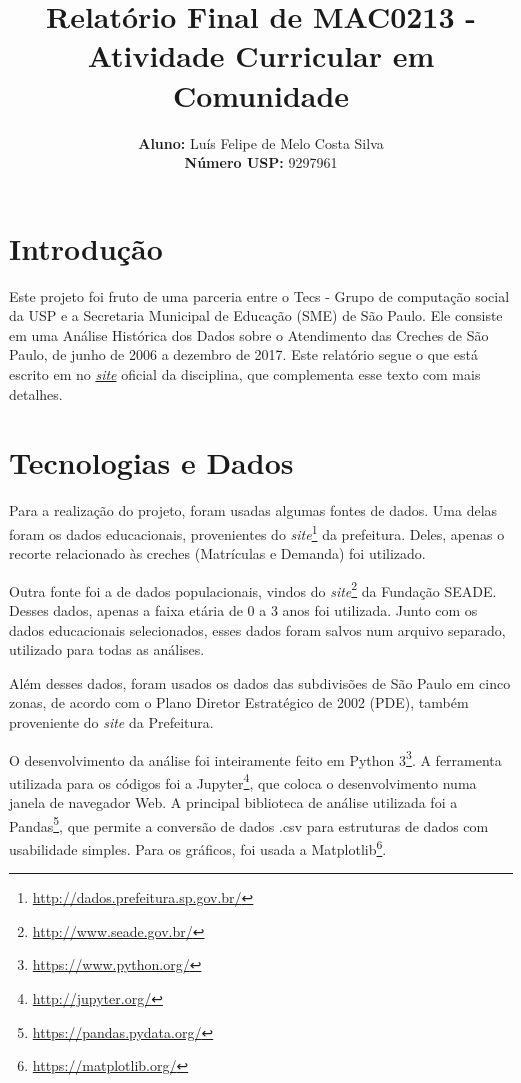 \documentclass[12pt, a4paper]{article}
\title{\textbf{Relatório Final de MAC0213 - Atividade Curricular em Comunidade}}
\author{
    \textbf{Aluno:} Luís Felipe de Melo Costa Silva \\
    \textbf{Número USP:} 9297961
    }
\date{}
\begin{document}
\maketitle

\section*{Introdução}

Este projeto foi fruto de uma parceria entre o Tecs - Grupo de computação social da USP e a Secretaria Municipal de Educação (SME) de São Paulo. Ele consiste em uma Análise Histórica dos Dados sobre o Atendimento das Creches de São Paulo, de junho de 2006 a dezembro de 2017. Este relatório segue o que está escrito em no \href{https://lsflp.github.io/MAC0213/}{\textit{site}} oficial da disciplina, que complementa esse texto com mais detalhes.

\section{Tecnologias e Dados}

Para a realização do projeto, foram usadas algumas fontes de dados. Uma delas foram os dados educacionais, provenientes do \textit{site}\footnote{\url{http://dados.prefeitura.sp.gov.br/}} da prefeitura. Deles, apenas o recorte relacionado às creches (Matrículas e Demanda) foi utilizado.

Outra fonte foi a de dados populacionais, vindos do \textit{site}\footnote{\url{http://www.seade.gov.br/}} da Fundação SEADE. Desses dados, apenas a faixa etária de 0 a 3 anos foi utilizada. Junto com os dados educacionais selecionados, esses dados foram salvos num arquivo separado, utilizado para todas as análises.

Além desses dados, foram usados os dados das subdivisões de São Paulo em cinco zonas, de acordo com o Plano Diretor Estratégico de 2002 (PDE), também proveniente do \textit{site} da Prefeitura.

O desenvolvimento da análise foi inteiramente feito em Python 3\footnote{\url{https://www.python.org/}}. A ferramenta utilizada para os códigos foi a Jupyter\footnote{\url{http://jupyter.org/}}, que coloca o desenvolvimento numa janela de navegador Web. A principal biblioteca de análise utilizada foi a Pandas\footnote{\url{https://pandas.pydata.org/}}, que permite a conversão de dados .csv para estruturas de dados com usabilidade simples. Para os gráficos, foi usada a Matplotlib\footnote{\url{https://matplotlib.org/}}.
\end{document}

